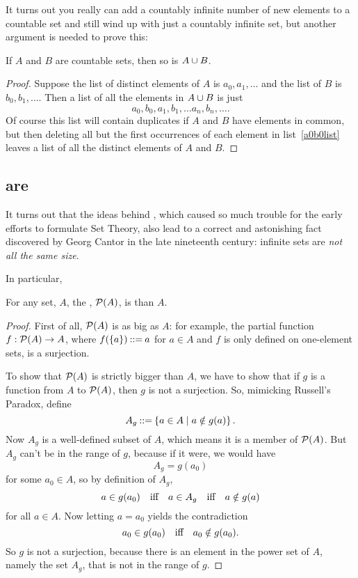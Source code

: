 It turns out you really can add a countably infinite number of new
elements to a countable set and still wind up with just a countably
infinite set, but another argument is needed to prove this:

\begin{lemma}\label{countable-union}
If $A$ and $B$ are countable sets, then so is $A \cup B$.
\end{lemma}

\begin{proof}
Suppose the list of distinct elements of $A$ is $a_0,a_1,\dots$ and the
list of $B$ is $b_0,b_1, \dots$.  Then a list of all the elements in $A
\cup B$ is just
\begin{equation}\label{a0b0list}
a_0,b_0,a_1,b_1, \dots a_n,b_n, \dots.
\end{equation}
Of course this list will contain duplicates if $A$ and $B$ have elements
in common, but then deleting all but the first occurrences of each element in
list~\eqref{a0b0list} leaves a list of all the distinct elements of $A$
and $B$.
\end{proof}

\subsection{ are }

It turns out that the ideas behind , which
caused so much trouble for the early efforts to formulate Set Theory,
also lead to a correct and astonishing fact discovered by Georg Cantor
in the late nineteenth century: infinite sets are \emph{not all the
same size}.

In particular,
\begin{theorem}\label{powbig}
For any set, $A$, the , $\mathcal{P}(A)$, is  than $A$.
\end{theorem}
\begin{proof}
  First of all, $\mathcal{P}(A)$ is as big as $A$: for example, the partial
  function $f:\mathcal{P}(A) \to A$, where $f(\left\{a\right\}) \mathbin{::=} a$ for $a \in A$
  and $f$ is only defined on one-element sets, is a surjection.

  To show that $\mathcal{P}(A)$ is strictly bigger than $A$, we have to show
  that if $g$ is a function from $A$ to $\mathcal{P}(A)$, then $g$ is not a
  surjection.  So, mimicking Russell's Paradox, define
  \[
  A_g \mathbin{::=} \left\{a \in A \mid a \notin g(a)\right\}.
  \]
  Now $A_g$ is a well-defined subset of $A$, which means it is a member of
  $\mathcal{P}(A)$.  But $A_g$ can't be in the range of $g$, because if it
  were, we would have
\[
A_g = g(a_0)
\]
for some $a_0 \in A$, so by definition of $A_g$,
\[
a \in g(a_0) \quad \text{iff} \quad a \in A_g \quad \text{iff} \quad a \notin g(a)
\]
for all $a \in A$.  Now letting $a = a_0$ yields the contradiction
\[
a_0 \in g(a_0) \quad \text{iff} \quad a_0 \notin g(a_0).
\]
So $g$ is not a surjection, because there is an element in the power set
of $A$, namely the set $A_g$, that is not in the range of $g$.
\end{proof}

